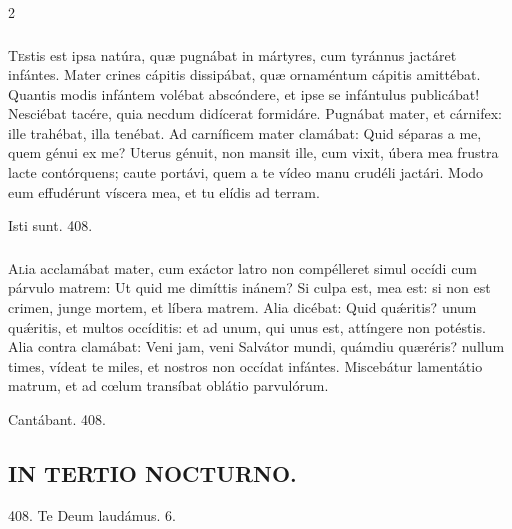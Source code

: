 \documentclass[9pt,twoside]{extarticle}
\begin{document}
\begin{multicols}{2}
\subsubsection*{\center {}}
\lettrine{T}estis est ipsa natúra, quæ pugnábat in mártyres, cum tyránnus jactáret infántes. Mater crines cápitis dissipábat, quæ ornaméntum cápitis amittébat. Quantis modis infántem volébat abscóndere, et ipse se infántulus publicábat! Nesciébat tacére, quia necdum didícerat formidáre. Pugnábat mater, et cárnifex: ille trahébat, illa tenébat. Ad carníficem mater clamábat: Quid séparas a me, quem génui ex me? Uterus génuit, non mansit ille, cum vixit, úbera mea frustra lacte contórquens; caute portávi, quem a te vídeo manu crudéli jactári. Modo eum effudérunt víscera mea, et tu elídis ad terram.

\begin{tightlist}{}
\item {} Isti sunt. 408.
\end{tightlist}

\subsubsection*{\center {}}
\lettrine{A}lia acclamábat mater, cum exáctor latro non compélleret simul occídi cum párvulo matrem: Ut quid me dimíttis inánem? Si culpa est, mea est: si non est crimen, junge mortem, et líbera matrem. Alia dicébat: Quid quǽritis? unum quǽritis, et multos occíditis: et ad unum, qui unus est, attíngere non potéstis. Alia contra clamábat: Veni jam, veni Salvátor mundi, quámdiu quæréris? nullum times, vídeat te miles, et nostros non occídat infántes. Miscebátur lamentátio matrum, et ad cœlum transíbat oblátio parvulórum.

\begin{tightlist}{}
\item {} Cantábant. 408.
\end{tightlist}

\subsection*{\center \textsc{IN TERTIO NOCTURNO.}}
\begin{tightlist}{}
\item {} 408.  Te Deum laudámus. 6.
\item {}
\end{tightlist}



\end{multicols}
\end{document}

